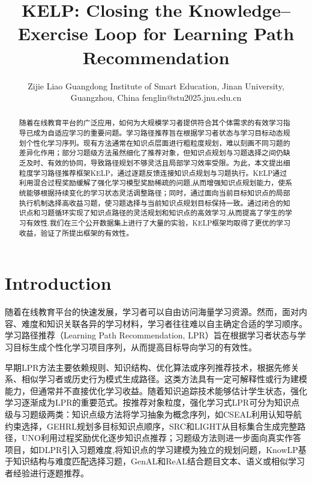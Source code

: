 \documentclass[11pt,a4paper]{article}
\title{KELP: Closing the Knowledge–Exercise Loop for Learning Path Recommendation}
\author{%
    Zijie Liao
    \affiliations
    Guangdong Institute of Smart Education, Jinan University, Guangzhou, China
    \emails
    fenglin@stu2025.jnu.edu.cn
}
\begin{document}
\maketitle

\begin{abstract}
随着在线教育平台的广泛应用，如何为大规模学习者提供符合其个体需求的有效学习指导已成为自适应学习的重要问题。学习路径推荐旨在根据学习者状态与学习目标动态规划个性化学习序列。现有方法通常在知识点层面进行粗粒度规划，难以刻画不同习题的差异化作用；部分习题级方法虽然细化了推荐对象，但知识点规划与习题选择之间仍缺乏及时、有效的协同，导致路径规划不够灵活且局部学习效率受限。为此，本文提出细粒度学习路径推荐框架KELP，通过逐题反馈连接知识点规划与习题执行。KELP通过利用混合过程奖励缓解了强化学习模型奖励稀疏的问题,从而增强知识点规划能力，使系统能够根据持续变化的学习状态灵活调整路径；同时，通过面向当前目标知识点的局部执行机制选择高收益习题，使习题选择与当前知识点规划目标保持一致。通过闭合的知识点和习题循环实现了知识点路径的灵活规划和知识点的高效学习,从而提高了学生的学习有效性.我们在三个公开数据集上进行了大量的实验，KELP框架均取得了更优的学习收益，验证了所提出框架的有效性。
\end{abstract}

\section{Introduction}
随着在线教育平台的快速发展，学习者可以自由访问海量学习资源\cite{korableva2019studying,zhang2019hierarchical}。然而，面对内容、难度和知识关联各异的学习材料，学习者往往难以自主确定合适的学习顺序。学习路径推荐（Learning Path Recommendation, LPR）旨在根据学习者状态与学习目标生成个性化学习项目序列，从而提高目标导向学习的有效性\cite{nabizadeh2020learning,guan2025explainable,liu2019exploiting}。

早期LPR方法主要依赖规则、知识结构、优化算法或序列推荐技术，根据先修关系、相似学习者或历史行为模式生成路径\cite{nabizadeh2020learning,cover1967nearest,hidasi2015session}。这类方法具有一定可解释性或行为建模能力，但通常并不直接优化学习收益。随着知识追踪技术能够估计学生状态，强化学习逐渐成为LPR的重要范式。按推荐对象粒度，强化学习式LPR可分为知识点级与习题级两类：知识点级方法将学习抽象为概念序列，如CSEAL利用认知导航约束选择\cite{liu2019exploiting}，GEHRL规划多目标知识点顺序\cite{li2023graph}，SRC和LIGHT从目标集合生成完整路径\cite{chen2023set,yu2025light}，UNO利用过程奖励优化逐步知识点推荐\cite{peng2026uno}；习题级方法则进一步面向真实作答项目，如DLPR引入习题难度,将知识点的学习建模为独立的规划问题\cite{zhang2024item}，KnowLP基于知识结构与难度匹配选择习题\cite{cheng2026graphrag}，GenAL和ReAL结合题目文本、语义或相似学习者经验进行逐题推荐\cite{lv2025genal,lv2025real}。
\end{document}
